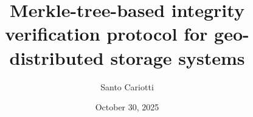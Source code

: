 \documentclass{beamer}
\title{Merkle-tree-based integrity verification protocol for geo-distributed storage
systems}
\author{Santo Cariotti}
\institute{Alma Mater Studiorum\\ Università di Bologna}
\date{October 30, 2025}
\begin{document}
\frame{\titlepage}








\end{document}
